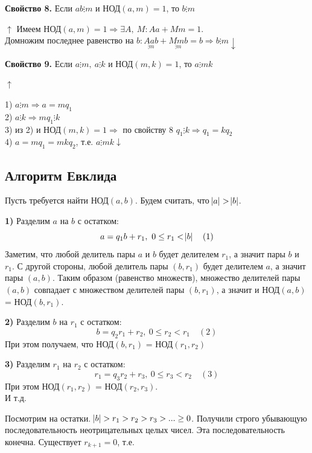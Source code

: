 \documentclass{article}
\begin{document}
            \textbf{Свойство 8.} Если \( ab \vdots m \) и \( \textrm{НОД}(a, m) = 1 \), то \( b \vdots m \)

            \( \uparrow \) Имеем \( \textrm{НОД}(a,m) = 1 \Rightarrow \exists A,\ M: Aa + Mm = 1. \)\\
            Домножим последнее равенство на \( b: \underset{\vdots m}{Aab} + \underset{\vdots m}{Mmb} = b \Rightarrow b \vdots m \downarrow \)

            \textbf{Свойство 9.} Если \( a \vdots m,\ a \vdots k \) и \( \textrm{НОД}(m,k) = 1 \), то \(a \vdots mk \)

            \( \uparrow \)

            1) \( a \vdots m \Rightarrow a = mq_1 \)\\
            2) \( a \vdots k \Rightarrow mq_1 \vdots k \)\\
            3) из 2) и \( \textrm{НОД}(m,k) = 1 \Rightarrow \) по свойству 8 \( q_1 \vdots k \Rightarrow q_1 = kq_2 \)\\
            4) \( a = mq_1 = mkq_2 \), т.е. \( a \vdots mk \downarrow \)
            
        \subsection{Алгоритм Евклида}
        	Пусть требуется найти НОД\( (a,b) \). Будем считать, что \( \abs{a} > \abs{b} \).

            \textbf{1)} Разделим \( a \) на \( b \) с остатком: \[ a = q_1b + r_1,\ 0 \leq r_1 < \abs{b}\quad (1) \]
            Заметим, что любой делитель пары \( a \) и \( b \) будет делителем \( r_1 \), а значит пары \( b \) и \( r_1 \). С другой стороны, любой делитель пары \( (b,r_1) \) будет делителем \( a \), а значит пары \( (a,b) \). Таким образом (равенство множеств), множество делителей пары \( (a,b) \) совпадает с множеством делителей пары \( (b,r_1) \), а значит и НОД\( (a,b) \) = НОД\( (b,r_1) \).

            \textbf{2)} Разделим \( b \) на \( r_1 \) с остатком: \[ b = q_2r_1 + r_2,\ 0 \leq r_2 < r_1\quad (2) \]
            При этом получаем, что НОД\( (b,r_1) \) = НОД\( (r_1,r_2) \)

            \textbf{3)} Разделим \( r_1 \) на \( r_2 \) с остатком: \[ r_1 = q_3r_2 + r_3,\ 0 \leq r_3 < r_2\quad (3) \]
            При этом НОД\( (r_1, r_2) \) = НОД\( (r_2, r_3) \).\\
            И т.д.

            Посмотрим на остатки. \( \abs{b} > r_1 > r_2 > r_3 > ... \geq 0 \). Получили строго убывающую последовательность неотрицательных целых чисел. Эта последовательность конечна. Существует \( r_{k+1} = 0 \), т.е.
\end{document}
